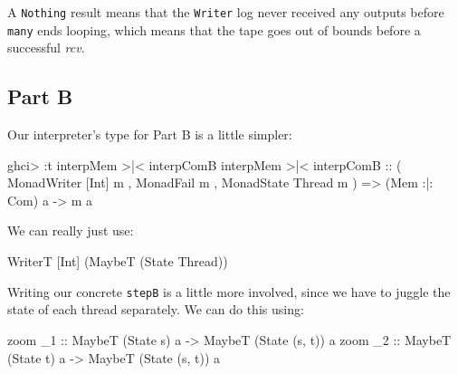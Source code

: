 \documentclass[]{article}
\newenvironment{Shaded}{}{}
\newcommand{\DataTypeTok}[1]{\textcolor[rgb]{0.56,0.13,0.00}{#1}}
\newcommand{\FunctionTok}[1]{\textcolor[rgb]{0.02,0.16,0.49}{#1}}
\newcommand{\NormalTok}[1]{#1}
\newcommand{\OtherTok}[1]{\textcolor[rgb]{0.00,0.44,0.13}{#1}}
\begin{document}
A \texttt{Nothing} result means that the \texttt{Writer} log never received any
outputs before \texttt{many} ends looping, which means that the tape goes out of
bounds before a successful \emph{rcv}.

\hypertarget{part-b}{%
\subsection{Part B}\label{part-b}}

Our interpreter's type for Part B is a little simpler:

\begin{Shaded}
\begin{Highlighting}[]
\NormalTok{ghci}\FunctionTok{>} \FunctionTok{:}\NormalTok{t interpMem }\FunctionTok{>|<}\NormalTok{ interpComB}
\NormalTok{interpMem }\FunctionTok{>|<}\NormalTok{ interpComB}
\OtherTok{    ::}\NormalTok{ ( }\DataTypeTok{MonadWriter}\NormalTok{ [}\DataTypeTok{Int}\NormalTok{] m}
\NormalTok{       , }\DataTypeTok{MonadFail}\NormalTok{ m}
\NormalTok{       , }\DataTypeTok{MonadState} \DataTypeTok{Thread}\NormalTok{ m}
\NormalTok{       )}
    \OtherTok{=>}\NormalTok{ (}\DataTypeTok{Mem} \FunctionTok{:|:} \DataTypeTok{Com}\NormalTok{) a}
    \OtherTok{->}\NormalTok{ m a}
\end{Highlighting}
\end{Shaded}

We can really just use:

\begin{Shaded}
\begin{Highlighting}[]
\DataTypeTok{WriterT}\NormalTok{ [}\DataTypeTok{Int}\NormalTok{] (}\DataTypeTok{MaybeT}\NormalTok{ (}\DataTypeTok{State} \DataTypeTok{Thread}\NormalTok{))}
\end{Highlighting}
\end{Shaded}

Writing our concrete \texttt{stepB} is a little more involved, since we have to
juggle the state of each thread separately. We can do this using:

\begin{Shaded}
\begin{Highlighting}[]
\NormalTok{zoom}\OtherTok{ _1 ::} \DataTypeTok{MaybeT}\NormalTok{ (}\DataTypeTok{State}\NormalTok{ s) a }\OtherTok{->} \DataTypeTok{MaybeT}\NormalTok{ (}\DataTypeTok{State}\NormalTok{ (s, t)) a}
\NormalTok{zoom}\OtherTok{ _2 ::} \DataTypeTok{MaybeT}\NormalTok{ (}\DataTypeTok{State}\NormalTok{ t) a }\OtherTok{->} \DataTypeTok{MaybeT}\NormalTok{ (}\DataTypeTok{State}\NormalTok{ (s, t)) a}
\end{Highlighting}
\end{Shaded}
\end{document}

